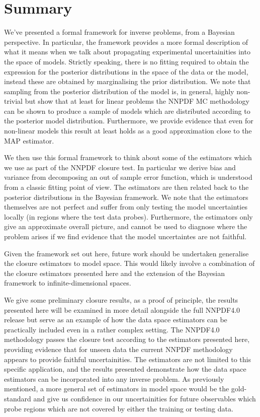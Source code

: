 \section{Summary}

We've presented a formal framework for inverse problems, from a Bayesian
perspective. In particular, the framework provides a more formal description
of what it means when we talk about propagating experimental uncertainities
into the space of models. Strictly speaking, there is no fitting required to
obtain the expression for the posterior distributions in the space of the
data or the model, instead these are obtained by marginalising the
prior distribution. We note that sampling from the posterior distribution
of the model is,
in general, highly non-trivial but show that at least for linear problems the
NNPDF MC methodology can be shown to produce a sample of models which are
distributed according to the posterior model distribution. Furthermore, we
provide evidence that even for non-linear models this result at least holds
as a good approximation close to the MAP estimator.

We then use this formal framework to think about some of the estimators which
we use as part of the NNPDF closure test. In particular we derive bias and
variance from decomposing an out of sample error function, which is understood
from a classic fitting point of view.
The estimators are then related back to the posterior distributions in
the Bayesian framework. We note that the estimators themselves are not perfect
and suffer from only testing the model uncertainties locally (in regions where
the test data probes). Furthermore, the estimators only give an approximate
overall picture, and cannot be used to diagnose where the problem arises if
we find evidence that the model uncertaintes are not faithful.

Given the framework set out here, future work should be undertaken
generalise the closure estimators to model space. This would likely involve
a combination of the closure estimators presented here and 
the extension of the Bayesian framework to
infinite-dimensional spaces.

We give some preliminary closure results, as a proof of principle, the results
presented here will be examined in more detail alongside the full NNPDF4.0
release but serve as an example of how the data space estimators can be practically
included even in a rather complex setting. The NNPDF4.0 methodology
passes the closure test according to the estimators presented here,
providing evidence that for unseen data the current NNPDF methodology
appears to provide faithful uncertainities. The estimators are not limited to
this specific application, and the results presented demonstrate how
the data space estimators can be incorporated into any inverse problem.
As previously mentioned, a more
general set of estimators in model space would be the gold-standard and give
us confidence in our uncertainities for future observables which probe
regions which are not covered by either the training or testing data.

